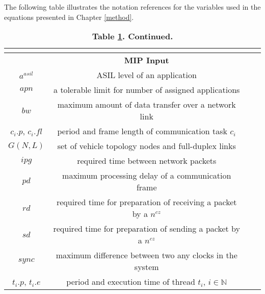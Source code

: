     The following table illustrates the notation references for the variables used in the equations presented in Chapter \ref{method}.

                \begin{longtable}{@{}c c c c@{}}%
                \caption{Notation Reference.}\\
                \label{notations}
                \endfirsthead
                \caption* {\textbf{Table \ref{notations}. Continued.}}\\\toprule
                \endhead
                \endfoot
                \endlastfoot
 			\toprule
    			&\textbf {MIP Input}\\
    			\midrule
    			$a^{asil}$ & ASIL level of an application \\[0.1cm]
    			$apn$ & a tolerable limit for number of assigned applications\\[0.1cm]
    			$bw$ & maximum amount of data transfer over a network link\\[0.1cm]
    			$c_i.p$, $c_i.fl$ & period and frame length of communication task $c_i$ \\[0.1cm]
    			$G(N,L)$ & set of vehicle topology nodes and full-duplex links \\[0.1cm]
    			$ipg$ & required time between network packets\\[0.1cm]
    			$pd$ & maximum processing delay of a communication frame\\[0.1cm]	
    			$rd$ & required time for preparation of receiving a packet by a $n^{cz}$ \\[0.1cm]					
    			$sd$ & required time for preparation of sending a packet by a $n^{cz}$ \\[0.1cm]
    			$sync$ & maximum difference between two any clocks in the system\\[0.1cm]
    			$t_i.p$, $t_i.e$& period and execution time of thread $t_i$, $i\in \mathbb{N}$ \\[0.1cm]

\end{longtable}
